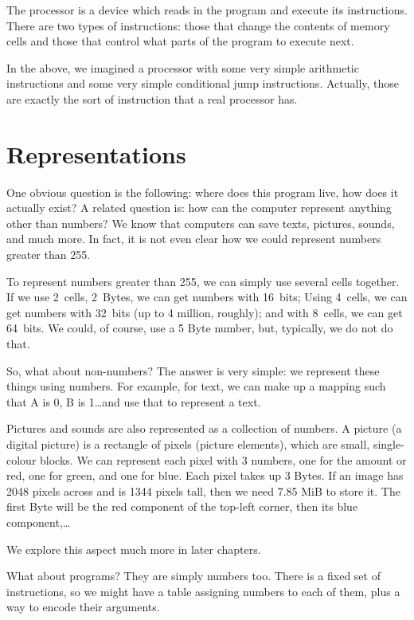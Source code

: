 The processor is a device which reads in the program and execute its
instructions. There are two types of instructions: those that change the
contents of memory cells and those that control what parts of the program to
execute next.

In the above, we imagined a processor with some very simple arithmetic
instructions and some very simple conditional jump instructions. Actually,
those are exactly the sort of instruction that a real processor has.

\section{Representations}

One obvious question is the following: where does this program live, how does
it actually exist? A related question is: how can the computer represent
anything other than numbers? We know that computers can save texts, pictures,
sounds, and much more. In fact, it is not even clear how we could represent
numbers greater than 255.

To represent numbers greater than 255, we can simply use several cells
together. If we use 2~cells, 2~Bytes, we can get numbers with 16~bits; Using
4~cells, we can get numbers with 32~bits (up to 4 million, roughly); and with
8~cells, we can get 64~bits. We could, of course, use a 5 Byte number, but,
typically, we do not do that.

So, what about non-numbers?  The answer is very simple: we represent these
things using numbers. For example, for text, we can make up a mapping such that
A is 0, B is 1\ldots and use that to represent a text.

Pictures and sounds are also represented as a collection of numbers. A picture
(a digital picture) is a rectangle of pixels (picture elements), which are
small, single-colour blocks. We can represent each pixel with 3 numbers, one
for the amount or red, one for green, and one for blue. Each pixel takes up 3
Bytes. If an image has 2048 pixels across and is 1344 pixels tall, then we need
7.85 MiB to store it. The first Byte will be the red component of the top-left
corner, then its blue component,\ldots

We explore this aspect much more in later chapters.

What about programs? They are simply numbers too. There is a fixed set of
instructions, so we might have a table assigning numbers to each of them, plus
a way to encode their arguments.


